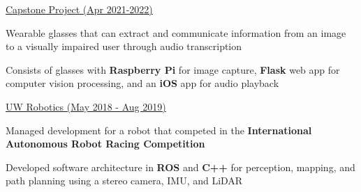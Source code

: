 \documentclass[]{awesome-cv}
\begin{document}
\begin{cventries}
	{\href{https://www.youtube.com/watch?v=aw0gHmt1xBc}{Capstone Project (Apr 2021-2022)}}
	{\begin{cvitems}
		\item {Wearable glasses that can extract and communicate information from an image to a visually impaired user through audio transcription}
		\item {Consists of glasses with \textbf{Raspberry Pi} for image capture, \textbf{Flask} web app for computer vision processing, and an \textbf{iOS} app for audio playback}
	\end{cvitems}}
	{\href{https://www.uwaterloorobotics.com}{UW Robotics (May 2018 - Aug 2019)}}
	{\begin{cvitems}
		\item {Managed development for a robot that competed in the \textbf{International Autonomous Robot Racing Competition}}
		\item {Developed software architecture in \textbf{ROS} and \textbf{C++} for perception, mapping, and path planning using a stereo camera, IMU, and LiDAR}
	\end{cvitems}}
\end{cventries}
\end{document}
